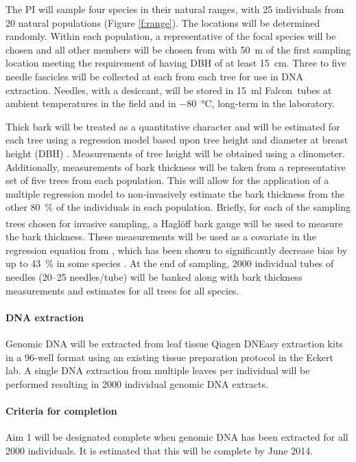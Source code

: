 The PI will sample four species in their natural ranges, with 25 individuals from 20 natural populations (Figure \ref{f:range}).  
The locations will be determined randomly.  Within each population, a representative 
of the focal species will be chosen and all other members will be chosen from with \SI{50}{m} of the first sampling location meeting 
the requirement of having DBH of at least \SI{15}{\cm}.  Three to five needle fascicles will be collected at each from each 
tree for use in DNA extraction.  Needles, with a desiccant, will be stored in \SI{15}{\ml} Falcon\texttrademark\ tubes  at 
ambient temperatures in the field and in \SI{-80}{\celsius}, long-term in the laboratory.  


Thick bark will be treated as a quantitative character and will be estimated for each tree using a regression model based 
upon tree height and diameter at breast height (DBH) \citep{Cao:1986th, Li:2010bl}.  Measurements of tree height will be obtained using a 
clinometer.  Additionally, measurements of bark thickness will be taken from a representative set of five trees from each population.  
This will allow for the application of a multiple regression model to non-invasively estimate the bark thickness from the other 
\SI{80}{\percent} of the individuals in each population.  Briefly, for each of the sampling trees chosen for invasive sampling, a 
Hagl\"{o}ff\textsuperscript{\textregistered} bark gauge will be used to measure the bark thickness.  These measurements will be used as a covariate in the 
regression equation from \citeauthor{Cao:1986th}, which has been shown to significantly decrease bias by up to \SI{43}{\percent} 
in some species \citep{Li:2010bl}.  At the end of sampling, \num{2000} individual tubes of needles (20--25 needles/tube) 
will be banked along with bark thickness measurements and estimates for all trees for all species.

\paragraph{DNA extraction}
Genomic DNA will be extracted from leaf tissue Qiagen DNEasy extraction kits in a 96-well format using an existing tissue preparation
protocol in the Eckert lab.  A single DNA extraction from multiple leaves per individual will be performed resulting in \num{2000} 
individual genomic DNA extracts.  

\paragraph{Criteria for completion}
Aim 1 will be designated complete when genomic DNA has been extracted for all \num{2000} individuals.  It is estimated that this will be 
complete by June 2014.


